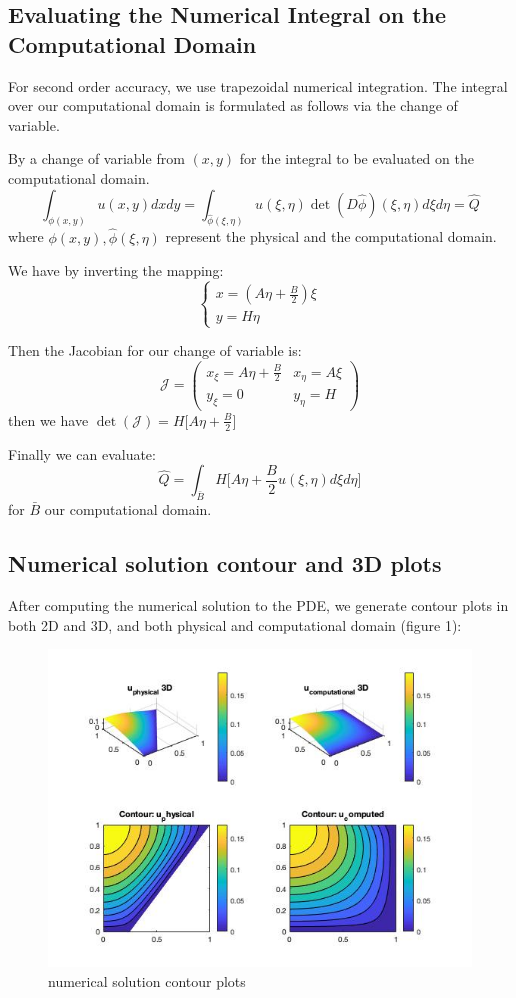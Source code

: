 \documentclass[12pt]{article}
\begin{document}
\subsection{Evaluating the Numerical Integral on the Computational Domain}

For second order accuracy, we use trapezoidal numerical integration. The integral over our computational domain is formulated as follows via the change of variable.

By a change of variable from $(x,y)$ for the integral to be evaluated on the computational domain.
$$
	\int_{\phi(x,y)}u(x,y)dxdy = \int_{\hat{\phi}(\xi,\eta)} u(\xi,\eta) \det{(D\hat{\phi})}(\xi,\eta)d\xi d\eta = \hat{Q}
$$ where $\phi(x,y),\hat{\phi}(\xi,\eta)$ represent the physical and the computational domain.

We have by inverting the mapping:
$$
	\begin{cases}
		x = (A\eta + \frac{B}{2})\xi \\
		y = H\eta
	\end{cases}
$$

Then the Jacobian for our change of variable is:
$$
	\mathcal{J} =
	\begin{pmatrix}
		x_{\xi} = A\eta + \frac{B}{2} & x_{\eta} = A\xi \\
		y_{\xi} = 0 & y_{\eta} = H
	\end{pmatrix}
$$ then we have $\det{(\mathcal{J})} = H\big[ A\eta + \frac{B}{2}\big]$

Finally we can evaluate:
$$
	\hat{Q} = \int_{\bar{B}} H\big[ A\eta + \frac{B}{2} u(\xi,\eta) d\xi d\eta \big]
$$ for $\bar{B}$ our computational domain.
\subsection{Numerical solution contour and 3D plots}
After computing the numerical solution to the PDE, we generate contour plots in both 2D and 3D, and both physical and computational domain (figure 1):
\begin{figure}[h]
	\centering
	\includegraphics[width=1\linewidth]{./solution_2d_3d.jpg}
	\caption{numerical solution contour plots}
\end{figure}
\end{document}
